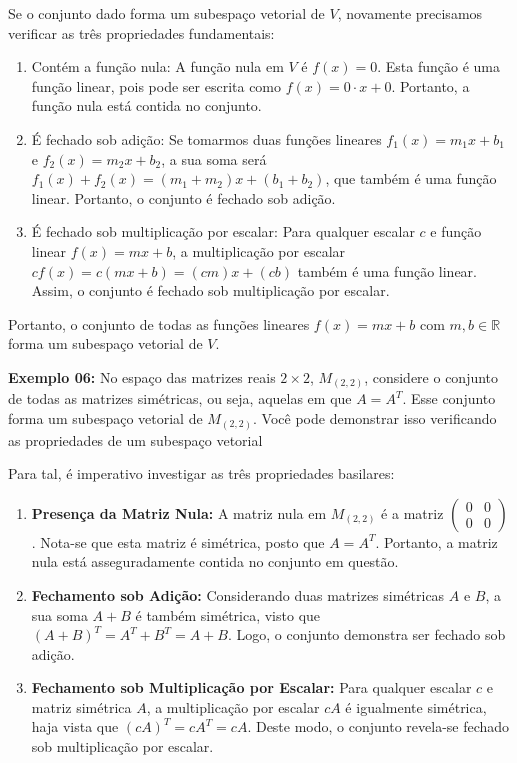 Se o conjunto dado forma um subespaço vetorial de $V$, novamente precisamos verificar as três propriedades fundamentais:

\begin{enumerate}
	\item Contém a função nula: A função nula em $V$ é $f(x) = 0$. Esta função é uma função linear, pois pode ser escrita como $f(x) = 0 \cdot x + 0$. Portanto, a função nula está contida no conjunto.

	\item É fechado sob adição: Se tomarmos duas funções lineares $f_1(x) = m_1x + b_1$ e $f_2(x) = m_2x + b_2$, a sua soma será $f_1(x) + f_2(x) = (m_1 + m_2)x + (b_1 + b_2)$, que também é uma função linear. Portanto, o conjunto é fechado sob adição.

	\item É fechado sob multiplicação por escalar: Para qualquer escalar $c$ e função linear $f(x) = mx + b$, a multiplicação por escalar $cf(x) = c(mx + b) = (cm)x + (cb)$ também é uma função linear. Assim, o conjunto é fechado sob multiplicação por escalar.
\end{enumerate}

Portanto, o conjunto de todas as funções lineares $f(x) = mx + b$ com $m, b \in \mathbb{R}$ forma um subespaço vetorial de $V$.

\noindent\textbf{Exemplo 06:} No espaço das matrizes reais $2 \times 2$, $M_{(2,2)}$, considere o conjunto de todas as matrizes simétricas, ou seja, aquelas em que $A = A^T$. Esse conjunto forma um subespaço vetorial de $M_{(2,2)}$. Você pode demonstrar isso verificando as propriedades de um subespaço vetorial

Para tal, é imperativo investigar as três propriedades basilares:

\begin{enumerate}
	\item \textbf{Presença da Matriz Nula:} A matriz nula em $M_{(2,2)}$ é a matriz $\begin{pmatrix} 0 & 0 \\ 0 & 0 \end{pmatrix}$. Nota-se que esta matriz é simétrica, posto que $A = A^T$. Portanto, a matriz nula está asseguradamente contida no conjunto em questão.

	\item \textbf{Fechamento sob Adição:} Considerando duas matrizes simétricas $A$ e $B$, a sua soma $A + B$ é também simétrica, visto que $(A + B)^T = A^T + B^T = A + B$. Logo, o conjunto demonstra ser fechado sob adição.

	\item \textbf{Fechamento sob Multiplicação por Escalar:} Para qualquer escalar $c$ e matriz simétrica $A$, a multiplicação por escalar $cA$ é igualmente simétrica, haja vista que $(cA)^T = cA^T = cA$. Deste modo, o conjunto revela-se fechado sob multiplicação por escalar.
\end{enumerate}

